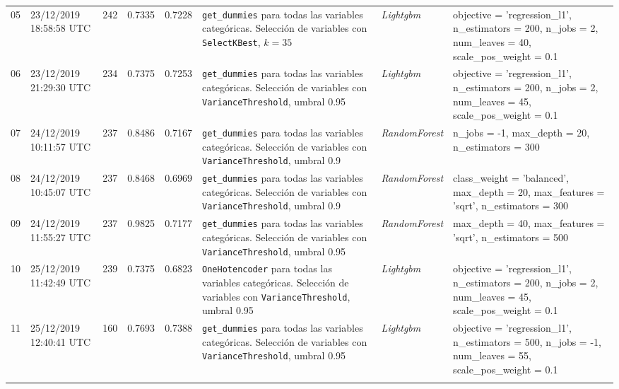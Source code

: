 \documentclass[a4paper, 20pt]{article}
\begin{document}
\begin{longtable}{lL{2.1cm}lllL{3cm}L{2.4cm}L{3.5cm}}
05 & 23/12/2019 18:58:58 UTC & 242 & 0.7335 & 0.7228 & \texttt{get\_dummies} para todas las variables categóricas. Selección de variables con \texttt{SelectKBest}, $k =35$ & \textit{Lightgbm} & {\ttfamily objective = 'regression\_l1', n\_estimators = 200, n\_jobs = 2, num\_leaves = 40, scale\_pos\_weight = 0.1}\\
\midrule

06 & 23/12/2019 21:29:30 UTC & 234 & 0.7375 & 0.7253 & \texttt{get\_dummies} para todas las variables categóricas. Selección de variables con \texttt{VarianceThreshold}, umbral 0.95 & \textit{Lightgbm} & {\ttfamily objective = 'regression\_l1', n\_estimators = 200, n\_jobs = 2, num\_leaves = 45, scale\_pos\_weight = 0.1}\\
\midrule

07 & 24/12/2019 10:11:57 UTC & 237 & 0.8486 & 0.7167 & \texttt{get\_dummies} para todas las variables categóricas. Selección de variables con \texttt{VarianceThreshold}, umbral 0.9 & \textit{RandomForest} & {\ttfamily n\_jobs = -1, max\_depth = 20, n\_estimators = 300}\\
\midrule

08 & 24/12/2019 10:45:07 UTC & 237 & 0.8468 & 0.6969 & \texttt{get\_dummies} para todas las variables categóricas. Selección de variables con \texttt{VarianceThreshold}, umbral 0.9 & \textit{RandomForest} & {\ttfamily class\_weight = 'balanced', max\_depth = 20, max\_features = 'sqrt', n\_estimators = 300}\\
\midrule

09 & 24/12/2019 11:55:27 UTC & 237 & 0.9825 & 0.7177 & \texttt{get\_dummies} para todas las variables categóricas. Selección de variables con \texttt{VarianceThreshold}, umbral 0.95 & \textit{RandomForest} & {\ttfamily max\_depth = 40, max\_features = 'sqrt', n\_estimators = 500}\\
\midrule

10 & 25/12/2019 11:42:49 UTC & 239 & 0.7375 & 0.6823 & \texttt{OneHotencoder} para todas las variables categóricas. Selección de variables con \texttt{VarianceThreshold}, umbral 0.95 & \textit{Lightgbm} & {\ttfamily objective = 'regression\_l1', n\_estimators = 200, n\_jobs = 2, num\_leaves = 45, scale\_pos\_weight = 0.1}\\
\midrule

11 & 25/12/2019 12:40:41 UTC & 160 & 0.7693 & 0.7388 & \texttt{get\_dummies} para todas las variables categóricas. Selección de variables con \texttt{VarianceThreshold}, umbral 0.95 & \textit{Lightgbm} & {\ttfamily objective = 'regression\_l1', n\_estimators = 500, n\_jobs = -1, num\_leaves = 55, scale\_pos\_weight = 0.1}\\
\midrule


\end{longtable}
\end{document}
